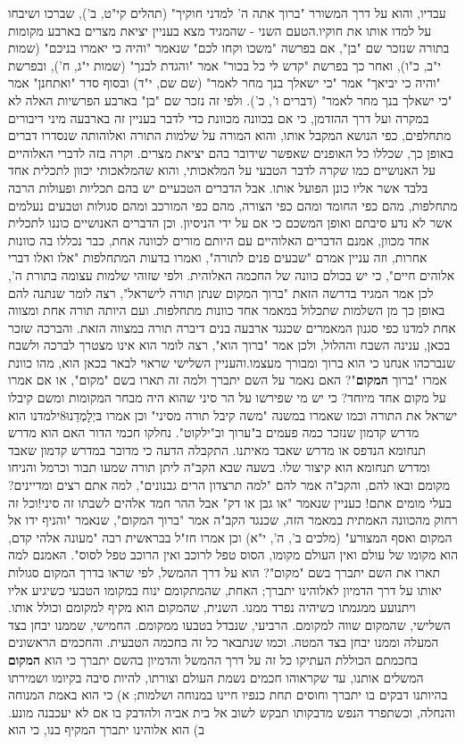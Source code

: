 \documentclass[12pt, openany]{book}
\begin{document}
עבדיו, והוא על דרך המשורר "ברוך אתה ה' למדני חוקיך" (תהלים קי"ט, ב'), שברכו ושיבחו על למדו אותו את חוקיו.הטעם השני -  שהמגיד מצא בעניין יציאת מצרים בארבע מקומות בתורה שנזכר שם "בן", אם בפרשה "משכו וקחו לכם" שנאמר "והיה כי יאמרו בניכם" (שמות י"ב, כ"ו), ואחר כך בפרשת "קדש לי כל בכור" אמר "והגדת לבנך" (שמות י"ג, ח'), ובפרשת "והיה כי יביאך" אמר "כי ישאלך בנך מחר לאמר" (שם שם, י"ד) ובסוף סדר "ואתחנן" אמר "כי ישאלך בנך מחר לאמר" (דברים ו', כ'). ולפי זה נזכר שם "בן" בארבע הפרשיות האלה לא במקרה ועל דרך ההזדמן, כי אם בכוונה מכוונת כדי לדבר בעניין זה בארבעה מיני דיבורים מתחלפים, כפי הנושא המקבל אותו, והוא המורה על שלמות התורה ואלוהותה שנסדרו דברים באופן כך, שכללו כל האופנים שאפשר שידובר בהם יציאת מצרים. וקרה בזה לדברי האלוהיים על האנושיים כמו שקרה לדבר הטבעי על המלאכותי, והוא שהמלאכותי יכוון לתכלית אחד בלבד אשר אליו כונן הפועל אותו. אבל הדברים הטבעיים יש בהם תכליות ופעולות הרבה מתחלפות, מהם כפי החומד ומהם כפי הצורה, מהם כפי המורכב ומהם סגולות וטבעים נעלמים אשר לא נדע סיבתם ואופן המשכם כי אם על ידי הניסיון. וכן הדברים האנושיים כוננו לתכלית אחד מכוון, אמנם הדברים האלוהיים עם היותם מורים לכוונה אחת, כבר נכללו בה כוונות אחרות, וזה עניין אמרם "שבעים פנים לתורה", ואמרו בדעות המתחלפות "אלו ואלו דברי אלוהים חיים", כי יש בכולם כוונה של החכמה האלוהית. ולפי שזוהי שלמות עצומה בתורת ה', לכן אמר המגיד בדרשה הזאת "ברוך המקום שנתן תורה לישראל", רצה לומר שנתנה להם באופן כך מן השלמות שתכלול במאמר אחד כוונות מתחלפות. ועם היותה תורה אחת ומצווה אחת למדנו כפי סגנון המאמרים שכנגד ארבעה בנים דיברה תורה במצווה הזאת. והברכה שזכר בכאן, ענינה השבח וההלול, ולכן אמר "ברוך הוא", רצה לומר הוא אינו מצטרך לברכה ולשבח שנברכהו אנחנו כי הוא ברוך ומבורך מעצמו.והעניין השלישי שראוי לבאר בכאן הוא, מהו כוונת אמרו "ברוך \textrm{\textbf{המקום}}"? האם נאמר על השם יתברך ולמה זה תארו בשם "מקום", או אם אמרו על מקום אחד מיוחד? כי יש מי שפירשו על הר סיני שהוא היה מבחר המקומות ומשם קיבלו ישראל את התורה וכמו שאמרו במשנה "משה קיבל תורה מסיני" וכן אמרו בּיְלָמְדֵנוּ8ילמדנו הוא מדרש קדמון שנזכר כמה פעמים ב"ערוך וב"ילקוט". נחלקו חכמי הדור האם הוא מדרש תנחומא הנדפס או מדרש שאבד מאיתנו. התקבלה הדעה כי מדובר במדרש קדמון שאבד ומדרש תנחומא הוא קיצור שלו. בשעה שבא הקב"ה ליתן תורה שמעו תבור וכרמל והניחו מקומם ובאו להם, והקב"ה אמר להם "למה תרצדון הרים גבנונים", למה אתם רצים ומדיינים? בעלי מומים אתם! כעניין שנאמר "או גבן או דק" אבל ההר חמד אלהים לשבתו זה סיני!וכל זה רחוק מהכוונה האמתית במאמר הזה, שכנגד הקב"ה אמר "ברוך המקום", שנאמר "והניף ידו אל המקום ואסף המצורע" (מלכים ב', ה', י"א) וכן אמרו חז"ל בבראשית רבה "מעונה אלהי קדם, הוא מקומו של עולם ואין העולם מקומו, הסוס טפל לרוכב ואין הרוכב טפל לסוס". האמנם למה תארו את השם יתברך בשם "מקום"? הוא על דרך ההמשל, לפי שראו בדרך המקום סגולות יאותו על דרך הדמיון לאלוהינו יתברך; האחת, שהמתקומם ינוח במקומו הטבעי כשיגיע אליו ויתנועע ממגמתו כשיהיה נפרד ממנו. השנית, שהמקום הוא מקיף למקומם וכולל אותו. השלישי, שהמקום שווה למקומם. הרביעי, שנבדל בטבעו ממקומם. החמישי, שממנו יבחן בצד המעלה וממנו יבחן בצד המטה. וכמו שנתבאר כל זה בחכמה הטבעית. והחכמים הראשונים בחכמתם הכוללת העתיקו כל זה על דרך ההמשל והדמיון בהשם יתברך כי הוא \textrm{\textbf{המקום}} המשלים אותנו, עד שקראוהו חכמים נשמת העולם וצורתו, להיות סיבה בקיומו ושמירתו בהיותנו דבקים בו יתברך וחוסים תחת כנפיו חיינו במנוחה ושלמות; א) כי הוא באמת המנוחה והנחלה, וכשתפרד הנפש מדבקותו תבקש לשוב אל בית אביה ולהדבק בו אם לא יעכבנה מונע. ב) הוא אלוהינו יתברך המקיף בנו, כי הוא 
\end{document}

